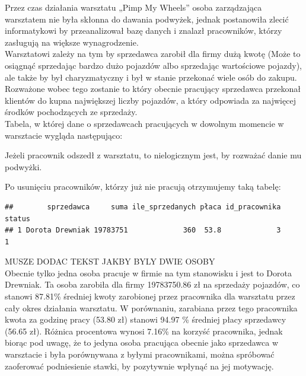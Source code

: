 \documentclass{article}\usepackage[]{graphicx}\usepackage[]{xcolor}
\makeatletter
\newenvironment{kframe}{%
 \def\at@end@of@kframe{}%
 \ifinner\ifhmode%
  \def\at@end@of@kframe{\end{minipage}}%
  \begin{minipage}{\columnwidth}%
 \fi\fi%
 \def\FrameCommand##1{\hskip\@totalleftmargin \hskip-\fboxsep
 \colorbox{shadecolor}{##1}\hskip-\fboxsep
     \hskip-\linewidth \hskip-\@totalleftmargin \hskip\columnwidth}%
 \MakeFramed {\advance\hsize-\width
   \@totalleftmargin\z@ \linewidth\hsize
   \@setminipage}}%
 {\par\unskip\endMakeFramed%
 \at@end@of@kframe}
\newenvironment{knitrout}{}{} %
\makeatother
\begin{document}
Przez czas działania warsztatu „Pimp My Wheels” osoba zarządzająca warsztatem nie była skłonna do dawania podwyżek, jednak postanowiła zlecić informatykowi by przeanalizował bazę danych i znalazł pracowników, którzy zasługują na większe wynagrodzenie. \\

Warsztatowi zależy na tym by sprzedawca zarobił dla firmy dużą kwotę (Może to osiągnąć sprzedając bardzo dużo pojazdów albo sprzedając wartościowe pojazdy), ale także by był charyzmatyczny i był w stanie przekonać wiele osób do zakupu. Rozważone wobec tego zostanie to który obecnie pracujący sprzedawca przekonał klientów do kupna największej liczby pojazdów, a który odpowiada za najwięcej środków pochodzących ze sprzedaży. \\


Tabela, w której dane o sprzedawcach  pracujących w dowolnym momencie w warsztacie wygląda następująco:



Jeżeli pracownik odszedł z warsztatu, to nielogicznym jest, by rozważać danie mu podwyżki.

Po usunięciu pracowników, którzy już nie pracują otrzymujemy taką tabelę:

\begin{knitrout}
\color{fgcolor}\begin{kframe}
\begin{verbatim}
##        sprzedawca     suma ile_sprzedanych płaca id_pracownika status
## 1 Dorota Drewniak 19783751             360  53.8             3      1
\end{verbatim}
\end{kframe}
\end{knitrout}

MUSZE DODAC TEKST JAKBY BYLY DWIE OSOBY \\

Obecnie tylko jedna osoba pracuje w firmie na tym stanowisku i jest to Dorota Drewniak. Ta osoba zarobiła dla firmy 19783750.86 zł na sprzedaży pojazdów, co stanowi 87.81\% średniej kwoty zarobionej przez pracownika dla warsztatu przez cały okres działania warsztatu. W porównaniu, zarabiana przez tego pracownika kwota za godzinę pracy (53.80 zł) stanowi 94.97 \% średniej płacy sprzedawcy (56.65 zł). Różnica procentowa wynosi 7.16\% na korzyść pracownika, jednak biorąc pod uwagę, że to jedyna osoba pracująca obecnie jako sprzedawca w warsztacie i była porównywana z byłymi pracownikami, można spróbować zaoferować podniesienie stawki, by pozytywnie wpłynąć na jej motywację. \\
\end{document}
